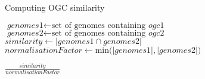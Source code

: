 \documentclass{article}
\begin{document}
\begin{algorithm}
\caption{Computing OGC similarity}\label{euclid}
\begin{algorithmic}[1]
\State $\textit{genomes1} \gets \text{set of genomes containing }\textit{ogc1}$
\State $\textit{genomes2} \gets \text{set of genomes containing }\textit{ogc2}$
\State $\textit{similarity} \gets \left\vert\textit{genomes1} \cap \textit{genomes2}\right\vert$
\State $\textit{normalisationFactor} \gets \text{min(}\left\vert\textit{genomes1}\right\vert,\left\vert\textit{genomes2}\right\vert)$

\State \Return $\frac{\textit{similarity}}{\textit{normalisationFactor}}$

\EndFunction
\end{algorithmic}
\end{algorithm}
\end{document}
